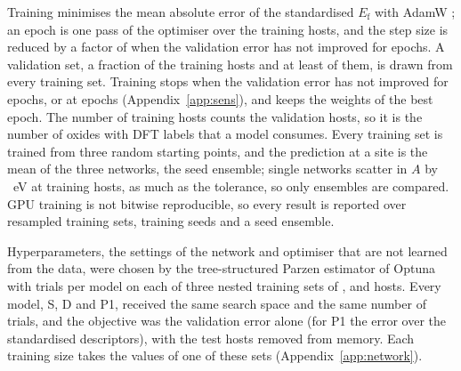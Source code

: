 Training minimises the mean absolute error of the standardised $E_\mathrm{f}$ with AdamW \citep{Loshchilov2019decoupled}; an epoch is one pass of the optimiser over the training hosts, and the step size is reduced by a factor of \numCfgTrainingSchedulerFactor{} when the validation error has not improved for \numCfgTrainingSchedulerPatience{} epochs. A validation set, a fraction \numCfgTrainingValidationFrac{} of the training hosts and at least \numCfgTrainingValidationMinHosts{} of them, is drawn from every training set. Training stops when the validation error has not improved for \numCfgTrainingEarlyStoppingPatience{} epochs, or at \numCfgTrainingMaxEpochs{} epochs (Appendix~\ref{app:sens}), and keeps the weights of the best epoch. The number of training hosts counts the validation hosts, so it is the number of oxides with DFT labels that a model consumes. Every training set is trained from three random starting points, and the prediction at a site is the mean of the three networks, the seed ensemble; single networks scatter in $A$ by \numNetSpreadSixHundredFiftyFourSingleRunASd{}~eV at \numCfgBudgetsMax{} training hosts, as much as the tolerance, so only ensembles are compared. GPU training is not bitwise reproducible, so every result is reported over resampled training sets, training seeds and a seed ensemble.

Hyperparameters, the settings of the network and optimiser that are not learned from the data, were chosen by the tree-structured Parzen estimator of Optuna \citep{Akiba2019optuna} with \numCfgTuningOptunaTrialsPerModelPerAnchor{} trials per model on each of three nested training sets of \numCfgTuningAnchorsItemOne{}, \numCfgTuningAnchorsItemTwo{} and \numCfgTuningAnchorsItemThree{} hosts. Every model, S, D and P1, received the same search space and the same number of trials, and the objective was the validation error alone (for P1 the error over the standardised descriptors), with the test hosts removed from memory. Each training size takes the values of one of these sets (Appendix~\ref{app:network}).

